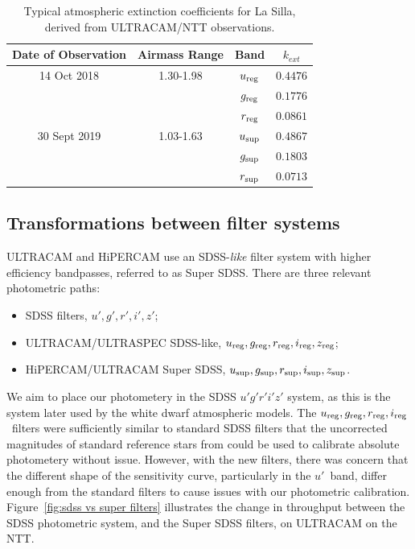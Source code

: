 \begin{table}
    \centering
    \caption{Typical atmospheric extinction coefficients for La Silla, derived from ULTRACAM/NTT observations.}
    \label{table:atmos_extinction}
    \begin{tabular}{cccc}
        \hline
        Date of Observation & Airmass Range & Band & $k_{ext}$ \\
        \hline
        \hline
        14 Oct 2018   & 1.30-1.98 & $u_{\rm reg}$ & $0.4476$ \\
                      &           & $g_{\rm reg}$ & $0.1776$ \\
                      &           & $r_{\rm reg}$ & $0.0861$ \\
        \hline
        30 Sept 2019  & 1.03-1.63 & $u_{\rm sup}$ & $0.4867$ \\
                      &           & $g_{\rm sup}$ & $0.1803$ \\
                      &           & $r_{\rm sup}$ & $0.0713$ \\
        \hline
    \end{tabular}
\end{table}


\subsection{Transformations between filter systems}
\label{sect:observations:colour correction method}

ULTRACAM and HiPERCAM use an SDSS-\emph{like} filter system with higher efficiency bandpasses, referred to as Super SDSS. There are three relevant photometric paths:
\begin{itemize}
\item SDSS filters, $u', g', r', i', z'$;
\item ULTRACAM/ULTRASPEC SDSS-like, $u_{\rm reg}, g_{\rm reg}, r_{\rm reg}, i_{\rm reg}, z_{\rm reg}$;
\item HiPERCAM/ULTRACAM Super SDSS, $u_{\rm sup}, g_{\rm sup}, r_{\rm sup}, i_{\rm sup}, z_{\rm sup}$.
\end{itemize}

We aim to place our photometery in the SDSS $u'g'r'i'z'$ system, as this is the system later used by the white dwarf atmospheric models. The $u_{\rm reg}, g_{\rm reg}, r_{\rm reg}, i_{\rm reg}$\ filters were sufficiently similar to standard SDSS filters that the uncorrected magnitudes of standard reference stars from \citet{smith2002} could be used to calibrate absolute photometery without issue. However, with the new filters, there was concern that the different shape of the sensitivity curve, particularly in the $u'$\ band, differ enough from the standard filters to cause issues with our photometric calibration. Figure~\ref{fig:sdss vs super filters} illustrates the change in throughput between the SDSS photometric system, and the Super SDSS filters, on ULTRACAM on the NTT. 

